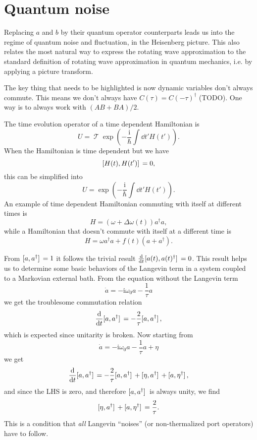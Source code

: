 \documentclass[hyperref, a4paper]{article}
\DeclareMathOperator{\timeorder}{\mathcal{T}}
\newcommand*{\ii}{\mathrm{i}}
\begin{document}
\section{Quantum noise}

Replacing $a$ and $b$ by their quantum operator counterparts 
leads us into the regime of quantum noise and fluctuation, in the Heisenberg picture.
This also relates the most natural way to express the rotating wave approximation
to the standard definition of rotating wave approximation in quantum mechanics, 
i.e. by applying a picture transform.

The key thing that needs to be highlighted is now dynamic variables don't always commute.
This means we don't always have $C(\tau) = C(-\tau)^\dag$ (TODO).
One way is to always work with $(AB + BA)/2$.

The time evolution operator of a time dependent Hamiltonian is 
\begin{equation}
    U = \timeorder \exp(- \frac{\ii}{\hbar} \int \dd{t'} H(t')).
\end{equation}
When the Hamiltonian is time dependent but we have 
\begin{equation}
    \comm*{H(t)}{H(t')} = 0,
\end{equation}
this can be simplified into 
\begin{equation}
    U = \exp(- \frac{\ii}{\hbar} \int \dd{t'} H(t')).
\end{equation}
An example of time dependent Hamiltonian commuting with itself at different times is  
\begin{equation}
    H = (\omega + \Delta \omega(t)) a^\dag a,
\end{equation}
while a Hamiltonian that doesn't commute with itself at a different time is 
\begin{equation}
    H = \omega a^\dag a + f(t) (a + a^\dag).
\end{equation}

From $\comm*{a}{a^\dag} = 1$ it follows the trivial result $\dv{t} \comm*{a(t)}{a(t)^\dag} = 0$.
This result helps us to determine some basic behaviors of the Langevin term in a system 
coupled to a Markovian external bath.
From the equation without the Langevin term
\[
    \dot{a} = - \ii \omega_0 a - \frac{1}{\tau} a 
\]
we get the troublesome commutation relation
\[
    \dv{t} \comm*{a}{a^\dag} = - \frac{2}{\tau} \comm*{a}{a^\dag},
\]
which is expected since unitarity is broken.
Now starting from 
\begin{equation}
    \dot{a} = - \ii \omega_0 a - \frac{1}{\tau} a + \eta 
\end{equation}
we get 
\begin{equation}
    \dv{t} \comm*{a}{a^\dag} = - \frac{2}{\tau} \comm*{a}{a^\dag} + \comm*{\eta}{a^\dagger} + \comm*{a}{\eta^\dag} ,    
\end{equation}
and since the LHS is zero, and therefore $\comm*{a}{a^\dag}$ is always unity,
we find 
\begin{equation}
    \comm*{\eta}{a^\dag} + \comm*{a}{\eta^\dag} = \frac{2}{\tau}.
\end{equation}
This is a condition that \emph{all} Langevin ``noises'' 
(or non-thermalized port operators) have to follow.
\end{document}
